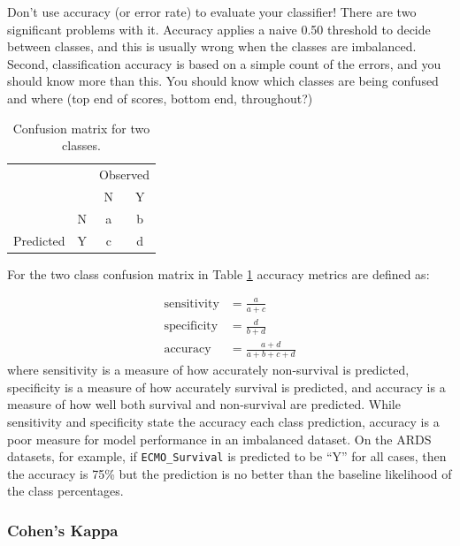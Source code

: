 \documentclass[12pt,]{article}
\begin{document}
Don't use accuracy (or error rate) to evaluate your classifier! There
are two significant problems with it. Accuracy applies a naive 0.50
threshold to decide between classes, and this is usually wrong when the
classes are imbalanced. Second, classification accuracy is based on a
simple count of the errors, and you should know more than this. You
should know which classes are being confused and where (top end of
scores, bottom end, throughout?)

\begin{table}[!h]

\caption{\label{tab:unnamed-chunk-3}\label{tab:confusion-matrix} Confusion matrix for two classes.}
\centering
\fontsize{12}{14}\selectfont
\begin{tabular}{lc|cc}
\toprule
\multicolumn{2}{c}{ } & \multicolumn{2}{c}{Observed} \\
\cmidrule(l{3pt}r{3pt}){3-4}
  &   & N & Y\\
\midrule
\rowcolor{gray!6}   & N & a & b\\

\multirow{-2}{*}{\raggedright\arraybackslash Predicted} & Y & c & d\\
\bottomrule
\end{tabular}
\end{table}

For the two class confusion matrix in Table \ref{tab:confusion-matrix}
accuracy metrics are defined as:

\[
\begin{aligned}
\text{sensitivity} &= \frac{a}{a+c} \\
\text{specificity} &= \frac{d}{b+d} \\
\text{accuracy} &= \frac{a+d}{a+b+c+d}
\end{aligned}
\] where sensitivity is a measure of how accurately non-survival is
predicted, specificity is a measure of how accurately survival is
predicted, and accuracy is a measure of how well both survival and
non-survival are predicted. While sensitivity and specificity state the
accuracy each class prediction, accuracy is a poor measure for model
performance in an imbalanced dataset. On the ARDS datasets, for example,
if \texttt{ECMO\_Survival} is predicted to be ``Y'' for all cases, then
the accuracy is 75\% but the prediction is no better than the baseline
likelihood of the class percentages.

\subsubsection{Cohen's Kappa}\label{cohens-kappa}
\end{document}
